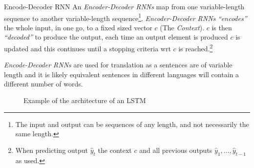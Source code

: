 \documentclass[11pt,a4paper]{article}
\begin{document}
  \begin{proposition}{Encode-Decoder RNN}
    An \textit{Encoder-Decoder RNNs} map from one variable-length sequence to another variable-length sequence\footnote{The input and output can be sequences of any length, and not necessarily the same length.}. \textit{Encoder-Decoder RNNs} \textit{``encodes''} the whole input, in one go, to a fixed sized vector $c$ (The \textit{Context}). $c$ is then \textit{``decoded''} to produce the output, each time an output element is produced $c$ is updated and this continues until a stopping criteria wrt $c$ is reached.\footnote{When predicting output $\hat{y}_t$ the context $c$ and all previous outputs $\hat{y}_1,\dots,\hat{y}_{t-1}$ as used.}
    \par \textit{Encode-Decoder RNNs} are used for translation as a sentences are of variable length and it is likely equivalent sentences in different languages will contain a different number of words.
  \end{proposition}

  \begin{figure}[H]
    \centering
    \caption{Example of the architecture of an LSTM}
    \label{fig_LSTM}
  \end{figure}
\end{document}
